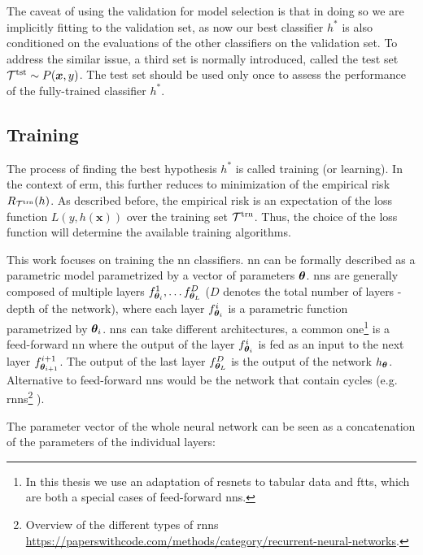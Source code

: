 The caveat of using the validation for model selection is that in doing so we are implicitly fitting to the validation set,
as now our best classifier $h^*$ is also conditioned on the evaluations of the other classifiers on the validation set.
To address the similar issue, a third set is normally introduced, called the test set ${\mathcal{T}^\text{tst}} \sim P(\bm{x}, y)$. The test
set should be used only once to assess the performance of the fully-trained classifier $h^*$.









\subsection{Training}

The process of finding the best hypothesis $h^*$ is called training (or learning). In the context of \gls{erm}, this
further reduces to minimization of the empirical risk $R_{\mathcal{T}^\text{trn}}(h)$. As described before, the empirical risk is an
expectation of the loss function $L(y, h(\bm{x}))$ over the training set ${\mathcal{T}^\text{trn}}$. Thus, the choice of the loss function
will determine the available training algorithms.

This work focuses on training the \gls{nn} classifiers. \gls{nn} can be formally described as a parametric model
parametrized by a vector of parameters ${\boldsymbol{\theta}}$. \glspl{nn} are generally composed of multiple layers
$f_{{\boldsymbol{\theta}}_i}^1, \dots f_{{\boldsymbol{\theta}}_L}^D$ ($D$ denotes the total number of layers - depth of the network), where
each layer $f_{{\boldsymbol{\theta}}_i}^i$ is a parametric function parametrized by ${\boldsymbol{\theta}}_i$.  \glspl{nn} can take different
architectures, a common one\footnote{In this thesis we use an adaptation of \glspl{resnet} to tabular data and
    \glspl{ftt}, which are both a special cases of feed-forward \glspl{nn}.} is a feed-forward \gls{nn} where the output
of the layer $f_{{\boldsymbol{\theta}}_i}^i$ is fed as an input to the next layer $f_{{\boldsymbol{\theta}}_{i+1}}^{i+1}$. The output
of the last layer $f_{{\boldsymbol{\theta}}_L}^D$ is the output of the network $h_{{\boldsymbol{\theta}}}$. Alternative to feed-forward
\glspl{nn} would be the network that contain cycles (e.g.  \glspl{rnn}\footnote{Overview of the different types of
    \glspl{rnn} \url{https://paperswithcode.com/methods/category/recurrent-neural-networks}.} \cite{rnn,lstm}).

The parameter vector of the whole neural network can be seen as a concatenation of the parameters of the individual
layers:

